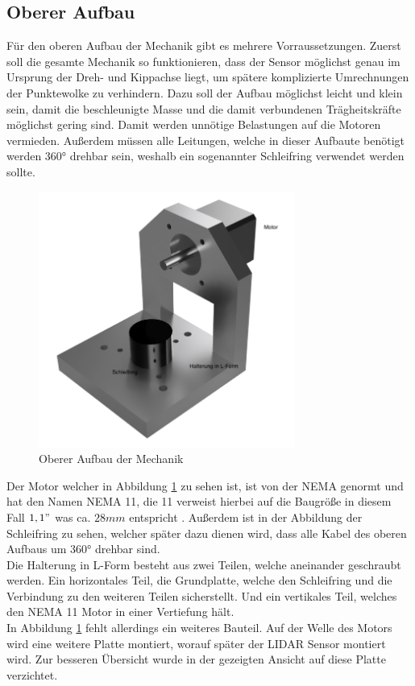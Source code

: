 \subsection{Oberer Aufbau}
Für den oberen Aufbau der Mechanik gibt es mehrere Vorraussetzungen. Zuerst soll die gesamte Mechanik so funktionieren, dass der Sensor möglichst genau im Ursprung der Dreh- und Kippachse liegt, um spätere komplizierte Umrechnungen der Punktewolke zu verhindern. Dazu soll der Aufbau möglichst leicht und klein sein, damit die beschleunigte Masse und die damit verbundenen Trägheitskräfte möglichst gering sind. Damit werden unnötige Belastungen auf die Motoren vermieden. Außerdem müssen alle Leitungen, welche in dieser Aufbaute benötigt werden 360° drehbar sein, weshalb ein sogenannter Schleifring verwendet werden sollte. 
\begin{figure}[H]
	\centering
	\includegraphics[width=0.75\textwidth]{images/Mechanik/ObererAufbau}
	\caption{Oberer Aufbau der Mechanik}
	\label{obereraufbau}
\end{figure}
Der Motor welcher in Abbildung \ref{obereraufbau} zu sehen ist, ist von der \ac{NEMA} genormt und hat den Namen \ac{NEMA} 11, die 11 verweist hierbei auf die Baugröße in diesem Fall $1,1"$ was ca. $28mm$ entspricht \cite{NEMA}. Außerdem ist in der Abbildung der Schleifring zu sehen, welcher später dazu dienen wird, dass alle Kabel des oberen Aufbaus um 360° drehbar sind. \\
Die Halterung in L-Form besteht aus zwei Teilen, welche aneinander geschraubt werden. Ein horizontales Teil, die Grundplatte, welche den Schleifring und die Verbindung zu den weiteren Teilen sicherstellt. Und ein vertikales Teil, welches den \ac{NEMA} 11 Motor in einer Vertiefung hält.\\
In Abbildung \ref{obereraufbau} fehlt allerdings ein weiteres Bauteil. Auf der Welle des Motors wird eine weitere Platte montiert, worauf später der \ac{LIDAR} Sensor montiert wird. Zur besseren Übersicht wurde in der gezeigten Ansicht auf diese Platte verzichtet.
